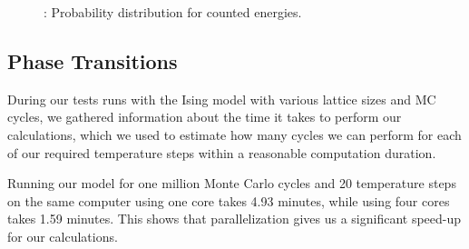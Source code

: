 \documentclass{article}
\begin{document}
{{		\begin{figure}[H]
		\caption{: Probability distribution for counted energies.}
		\label{fig:probability}
		\end{figure}

	\subsection{Phase Transitions}
		During our tests runs with the Ising model with various lattice sizes and MC cycles, we gathered information about the time it takes to perform our calculations, which we used to estimate how many cycles we can perform for each of our required temperature steps within a reasonable computation duration.

		Running our model for one million Monte Carlo cycles and 20 temperature steps on the same computer using one core takes 4.93 minutes, while using four cores takes 1.59 minutes. This shows that parallelization gives us a significant speed-up for our calculations. 

}}
\end{document}
